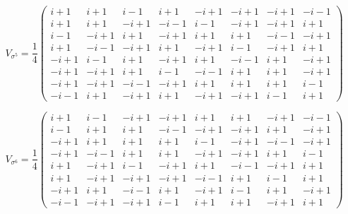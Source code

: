 \documentclass[a4paper]{article}
\begin{document}
  \begin{equation}
    V_{\sigma^5} = \frac{1}{4}
    \displaystyle \left(\begin{array}{rrrrrrrr}
i + 1 & i + 1 & i - 1 & i + 1 & -i + 1 & -i + 1 & -i + 1 & -i - 1 \\
i + 1 & i + 1 & -i + 1 & -i - 1 & i - 1 & -i + 1 & -i + 1 & i + 1 \\
i - 1 & -i + 1 & i + 1 & -i + 1 & i + 1 & i + 1 & -i - 1 & -i + 1 \\
i + 1 & -i - 1 & -i + 1 & i + 1 & -i + 1 & i - 1 & -i + 1 & i + 1 \\
-i + 1 & i - 1 & i + 1 & -i + 1 & i + 1 & -i - 1 & i + 1 & -i + 1 \\
-i + 1 & -i + 1 & i + 1 & i - 1 & -i - 1 & i + 1 & i + 1 & -i + 1 \\
-i + 1 & -i + 1 & -i - 1 & -i + 1 & i + 1 & i + 1 & i + 1 & i - 1 \\
-i - 1 & i + 1 & -i + 1 & i + 1 & -i + 1 & -i + 1 & i - 1 & i + 1
\end{array}\right)
  \end{equation}

  \begin{equation}
    V_{\sigma^6} = \frac{1}{4}
    \displaystyle \left(\begin{array}{rrrrrrrr}
i + 1 & i - 1 & -i + 1 & -i + 1 & i + 1 & i + 1 & -i + 1 & -i - 1 \\
i - 1 & i + 1 & i + 1 & -i - 1 & -i + 1 & -i + 1 & i + 1 & -i + 1 \\
-i + 1 & i + 1 & i + 1 & i + 1 & i - 1 & -i + 1 & -i - 1 & -i + 1 \\
-i + 1 & -i - 1 & i + 1 & i + 1 & -i + 1 & -i + 1 & i + 1 & i - 1 \\
i + 1 & -i + 1 & i - 1 & -i + 1 & i + 1 & -i - 1 & -i + 1 & i + 1 \\
i + 1 & -i + 1 & -i + 1 & -i + 1 & -i - 1 & i + 1 & i - 1 & i + 1 \\
-i + 1 & i + 1 & -i - 1 & i + 1 & -i + 1 & i - 1 & i + 1 & -i + 1 \\
-i - 1 & -i + 1 & -i + 1 & i - 1 & i + 1 & i + 1 & -i + 1 & i + 1
\end{array}\right)
  \end{equation}
\end{document}
